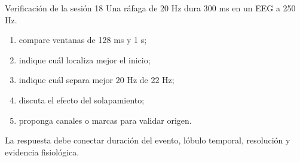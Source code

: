 \documentclass[
  ignorenonframetext,
  aspectratio=169,
  spanish,
]{beamer}
\providecommand{\tightlist}{%
  \setlength{\itemsep}{0pt}\setlength{\parskip}{0pt}}
\begin{document}
\begin{frame}{Verificación de la sesión 18}
  \protect{}\label{verificaciuxf3n-de-la-sesiuxf3n-18}
  Una ráfaga de 20 Hz dura 300 ms en un EEG a 250 Hz.

  \begin{enumerate}
    \tightlist
    \item
          compare ventanas de 128 ms y 1 s;
    \item
          indique cuál localiza mejor el inicio;
    \item
          indique cuál separa mejor 20 Hz de 22 Hz;
    \item
          discuta el efecto del solapamiento;
    \item
          proponga canales o marcas para validar origen.
  \end{enumerate}

  \begin{tcolorbox}[enhanced jigsaw, arc=.35mm, bottomrule=.15mm, bottomtitle=1mm, breakable, colback=white, colbacktitle=quarto-callout-tip-color!10!white, colframe=quarto-callout-tip-color-frame, coltitle=black, left=2mm, leftrule=.75mm, opacityback=0, opacitybacktitle=0.6, rightrule=.15mm, title=\textcolor{quarto-callout-tip-color}{\faLightbulb}\hspace{0.5em}{Criterio de logro}, titlerule=0mm, toprule=.15mm, toptitle=1mm]

    La respuesta debe conectar duración del evento, lóbulo temporal,
    resolución y evidencia fisiológica.

  \end{tcolorbox}
\end{frame}
\end{document}
